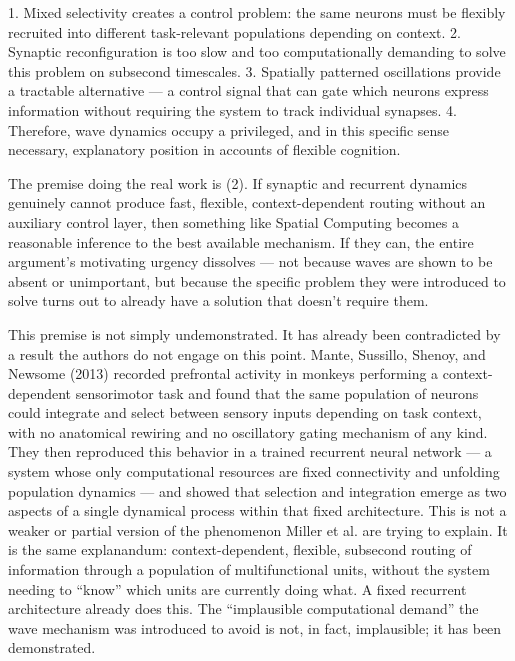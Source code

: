 \documentclass[11pt]{article}
\begin{document}
1. Mixed selectivity creates a control problem: the same neurons must be flexibly recruited into different task-relevant populations depending on context.
2. Synaptic reconfiguration is too slow and too computationally demanding to solve this problem on subsecond timescales.
3. Spatially patterned oscillations provide a tractable alternative — a control signal that can gate which neurons express information without requiring the system to track individual synapses.
4. Therefore, wave dynamics occupy a privileged, and in this specific sense necessary, explanatory position in accounts of flexible cognition.

The premise doing the real work is (2). If synaptic and recurrent dynamics genuinely cannot produce fast, flexible, context-dependent routing without an auxiliary control layer, then something like Spatial Computing becomes a reasonable inference to the best available mechanism. If they can, the entire argument's motivating urgency dissolves — not because waves are shown to be absent or unimportant, but because the specific problem they were introduced to solve turns out to already have a solution that doesn't require them.

This premise is not simply undemonstrated. It has already been contradicted by a result the authors do not engage on this point. Mante, Sussillo, Shenoy, and Newsome (2013) recorded prefrontal activity in monkeys performing a context-dependent sensorimotor task and found that the same population of neurons could integrate and select between sensory inputs depending on task context, with no anatomical rewiring and no oscillatory gating mechanism of any kind. They then reproduced this behavior in a trained recurrent neural network — a system whose only computational resources are fixed connectivity and unfolding population dynamics — and showed that selection and integration emerge as two aspects of a single dynamical process within that fixed architecture. This is not a weaker or partial version of the phenomenon Miller et al. are trying to explain. It is the same explanandum: context-dependent, flexible, subsecond routing of information through a population of multifunctional units, without the system needing to ``know'' which units are currently doing what. A fixed recurrent architecture already does this. The ``implausible computational demand'' the wave mechanism was introduced to avoid is not, in fact, implausible; it has been demonstrated.
\end{document}
